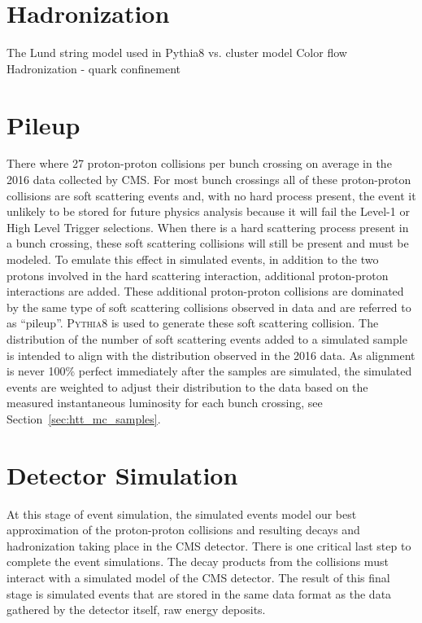 \section{Hadronization}
The Lund string model used in Pythia8 vs. cluster model
Color flow
Hadronization - quark confinement



\section{Pileup}
There where 27 proton-proton collisions per bunch crossing on average
in the 2016 data collected by CMS.
For most bunch crossings all of these proton-proton collisions are soft
scattering events and, with no hard process present, the event it unlikely to be stored for
future physics analysis because it will fail the Level-1 or High Level Trigger selections. 
When there is a hard scattering process present in a bunch crossing,
these soft scattering collisions will still be present and must be modeled. 
To emulate this effect in simulated events, in addition to the two protons involved in the 
hard scattering interaction, additional proton-proton interactions are added. 
These additional proton-proton collisions are
dominated by the same type of soft scattering collisions observed in data and are referred to as ``pileup''.
\textsc{Pythia8} is used to generate these soft scattering collision. 
The distribution of the number of soft scattering events added to a simulated 
sample is intended to align with the distribution observed in the 2016 data.
As alignment is never 100\% perfect immediately after the samples are simulated, the simulated events
are weighted to adjust their distribution to the data based on the measured instantaneous
luminosity for each bunch crossing, see Section~\ref{sec:htt_mc_samples}.



\section{Detector Simulation}
At this stage of event simulation, the simulated events model our best approximation
of the proton-proton collisions and resulting decays and hadronization taking place
in the CMS detector. There is one critical last step to complete the event
simulations. The decay products from the collisions must interact with a simulated
model of the CMS detector. The result of this final stage is simulated events that
are stored in the same data format as the data gathered by the detector itself,
raw energy deposits.


